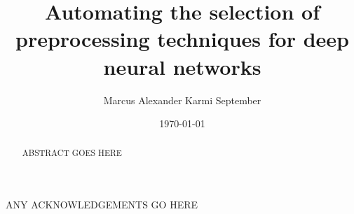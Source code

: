 \documentclass{statsmsc}
\title{Automating the selection of preprocessing techniques for deep neural networks}
\author{Marcus Alexander Karmi September}
\date{\today}
\begin{document}

\maketitle


\declarationdate{\today}
\declaration


\begin{abstract}
    ABSTRACT GOES HERE
\end{abstract}

\begin{acknowledgements}
    ANY ACKNOWLEDGEMENTS GO HERE
\end{acknowledgements}

{\thispagestyle{plain}
    \tableofcontents
}
\end{document}
